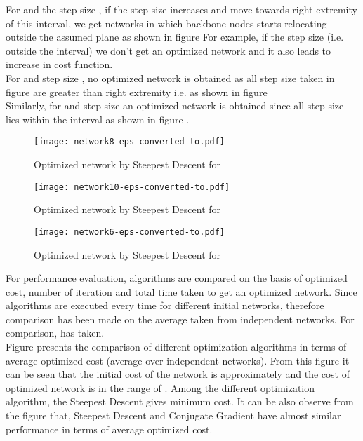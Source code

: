 \documentclass[11pt]{article}
\numberwithin{equation}{section}
\begin{document}
For  and the step size  , if the step size increases and move towards right extremity of this interval, we get networks in which backbone nodes starts relocating outside the assumed plane as shown in figure  For example, if the step size  (i.e. outside the interval) we don't get an optimized network and it also leads to increase in cost function.\\

For  and step size , no optimized network is obtained as all step size taken in figure are greater than right extremity i.e.  as shown in figure \\

Similarly, for  and step size  an optimized network is obtained since all step size lies within the interval as shown in figure .\\

\begin{figure*}[htb!]
\begin{center}
\texttt{[image: network8-eps-converted-to.pdf]}
\end{center}
\caption{Optimized network by Steepest Descent for }\label{f7}
\end{figure*}
\begin{figure*}[htb!]
\begin{center}
\texttt{[image: network10-eps-converted-to.pdf]}
\end{center}
\caption{Optimized network by Steepest Descent for }\label{f8}
\end{figure*}
\begin{figure*}[htb!]
\begin{center}
\texttt{[image: network6-eps-converted-to.pdf]}
\end{center}
\caption{Optimized network by Steepest Descent for }\label{f9}
\end{figure*}
\newpage
For performance evaluation, algorithms are compared on the basis of optimized cost, number of iteration and total time taken to get an optimized network. Since algorithms are executed every time for different initial networks, therefore comparison has been made on the average taken from  independent networks. For comparison,  has taken.\\

Figure  presents the comparison of different optimization algorithms in terms of average optimized cost (average over  independent networks). From this figure it can be seen that the initial cost of the network is approximately  and the cost of optimized network is in the range of . Among the different optimization algorithm, the Steepest Descent gives minimum cost. It can be also observe from the figure that, Steepest Descent and Conjugate Gradient have almost similar performance in terms of average optimized cost.\\
\end{document}
